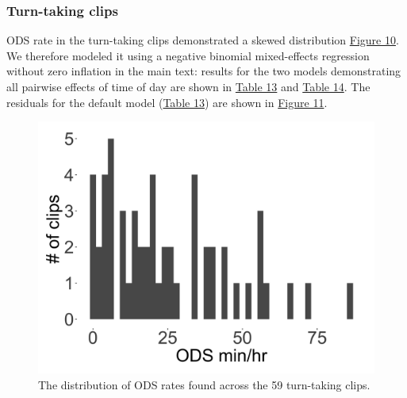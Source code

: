 \documentclass[,man,floatsintext]{apa6}
\begin{document}
\FloatBarrier

\subsubsection{Turn-taking clips}\label{models-ods-turntaking}

ODS rate in the turn-taking clips demonstrated a skewed distribution
\protect\hyperlink{fig10}{Figure 10}. We therefore modeled it using a
negative binomial mixed-effects regression without zero inflation in the
main text: results for the two models demonstrating all pairwise effects
of time of day are shown in \protect\hyperlink{tab13}{Table 13} and
\protect\hyperlink{tab14}{Table 14}. The residuals for the default model
(\protect\hyperlink{tab13}{Table 13}) are shown in
\protect\hyperlink{fig11}{Figure 11}.

\FloatBarrier

\begin{figure}[H]

{\centering \includegraphics[width=0.4\linewidth]{www/ODS_turntaking_distribution} 

}

\caption{The distribution of ODS rates found across the 59 turn-taking clips.}\label{fig:fig10}
\end{figure}

\FloatBarrier
\end{document}
